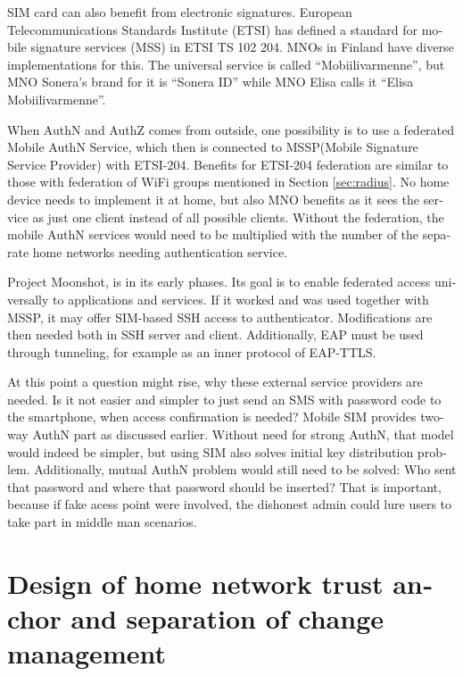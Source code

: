 \documentclass[12pt,a4paper,english]{tutthesis}
\begin{document}
\begin{otherlanguage}{english}
SIM card can also benefit from electronic signatures.
European Telecommunications Standards Institute (ETSI) has defined a
standard for mobile signature services (MSS) in ETSI TS 102 204.
MNOs in Finland have diverse implementations for this. The universal 
service is called ``Mobiilivarmenne'', but MNO Sonera's brand for it
is ``Sonera ID'' while MNO Elisa calls it ``Elisa Mobiilivarmenne''.

When AuthN and AuthZ comes from outside, one possibility is to use a
federated Mobile AuthN Service, which then is connected to  MSSP(Mobile
Signature Service Provider) with ETSI-204. Benefits for ETSI-204
federation are similar to those with federation of WiFi groups
mentioned in Section \ref{sec:radius}. No home device needs to implement it
at home, but also MNO benefits as it sees the service as just one
client instead of all possible clients.  Without the federation, the mobile AuthN services would need to be
multiplied with the number of the separate home networks needing authentication service.



Project Moonshot\cite{moonshot}, is in its early phases. Its goal is
to enable federated access universally to applications and
services. If it worked and was used together with MSSP, it may offer
SIM-based SSH access to authenticator. Modifications are then needed 
both in SSH server and client. Additionally, EAP must be used through
tunneling, for example as an inner protocol of EAP-TTLS.

At this point a question might rise, why these external service
providers are needed. Is it not easier and simpler to just send 
an SMS with password code to the smartphone, when access confirmation is needed?
Mobile SIM provides two-way AuthN part as discussed earlier.
Without need for strong AuthN, that model would indeed be 
simpler, but using SIM also solves initial key distribution problem.
Additionally, mutual AuthN problem would still need to be solved:
Who sent that password and where that password should be inserted?
That is important, because if fake acess point were involved, the 
dishonest admin could lure users to take part in middle man scenarios.





\chapter{Design of home network trust anchor and separation of change management}
\label{sec-4}






\end{otherlanguage}
\end{document}
